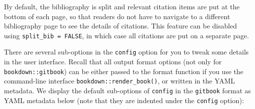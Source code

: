 \documentclass[
  12pt,
]{krantz}
\theoremstyle{definition}
\theoremstyle{definition}
\theoremstyle{definition}
\theoremstyle{definition}
\theoremstyle{remark}
\begin{document}
By default, the bibliography is split and relevant citation items are put at the bottom of each page, so that readers do not have to navigate to a different bibliography page to see the details of citations. This feature can be disabled using \texttt{split\_bib\ =\ FALSE}, in which case all citations are put on a separate page.

There are several sub-options in the \texttt{config} option for you to tweak some details in the user interface. Recall that all output format options (not only for \texttt{bookdown::gitbook}) can be either passed to the format function if you use the command-line interface \texttt{bookdown::render\_book()}, or written in the YAML metadata. We display the default sub-options of \texttt{config} in the \texttt{gitbook} format as YAML metadata below (note that they are indented under the \texttt{config} option):
\end{document}
